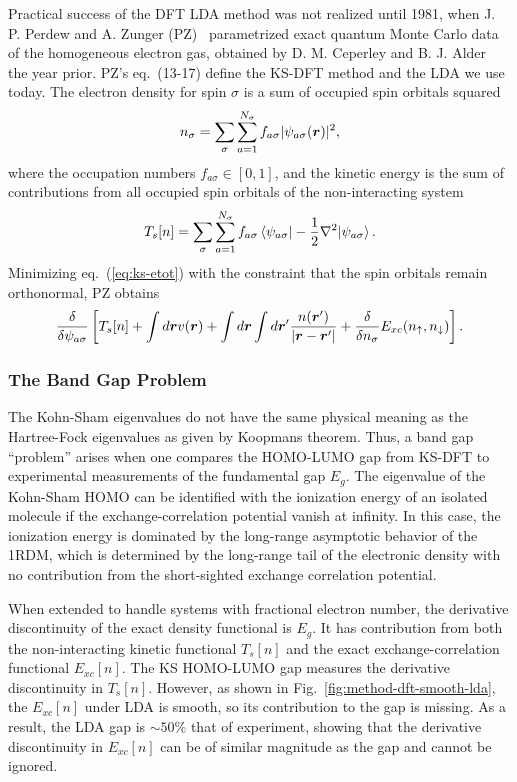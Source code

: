 Practical success of the DFT LDA method was not realized until 1981, when J. P. Perdew and A. Zunger (PZ)~\cite{Perdew1981} parametrized exact quantum Monte Carlo data of the homogeneous electron gas, obtained by D. M. Ceperley and B. J. Alder~\cite{Ceperley1980} the year prior. PZ's eq.~(13-17) define the KS-DFT method and the LDA we use today. The electron density for spin $\sigma$ is a sum of occupied spin orbitals squared
\begin{align}
n_{\sigma} = \sum\limits_{\sigma}\sum\limits_{a=1}^{N_{\sigma}}
f_{a\sigma} \vert\psi_{a\sigma}(\boldsymbol{r})\vert^2,
\end{align}
where the occupation numbers $f_{a\sigma}\in[0, 1]$, and the kinetic energy is the sum of contributions from all occupied spin orbitals of the non-interacting system
\begin{align}
T_s[n] = \sum\limits_\sigma\sum\limits_{a=1}^{N_{\sigma}}
f_{a\sigma} \braket{\psi_{a\sigma}|-\frac{1}{2}\nabla^2|\psi_{a\sigma}}.
\end{align}
Minimizing eq.~(\ref{eq:ks-etot}) with the constraint that the spin orbitals remain orthonormal, PZ obtains
\begin{align}
\dfrac{\delta}{\delta\psi_{a\sigma}} \left[
T_s[n] + \int d\boldsymbol{r}v(\boldsymbol{r}) + \int d\boldsymbol{r}\int d\boldsymbol{r}' \dfrac{n(\boldsymbol{r}')}{\vert\boldsymbol{r}-\boldsymbol{r}'\vert} +
\dfrac{\delta}{\delta n_{\sigma}} E_{xc}(n_{\uparrow},n_{\downarrow})
\right].
\end{align}

\subsubsection{The Band Gap Problem} \label{sec:method-dft-bandgap}
The Kohn-Sham eigenvalues do not have the same physical meaning as the Hartree-Fock eigenvalues as given by Koopmans theorem. Thus, a band gap ``problem'' arises when one compares the HOMO-LUMO gap from KS-DFT to experimental measurements of the fundamental gap $E_g$. The eigenvalue of the Kohn-Sham HOMO can be identified with the ionization energy of an isolated molecule if the exchange-correlation potential vanish at infinity.
In this case, the ionization energy is dominated by the long-range asymptotic behavior of the 1RDM, which is determined by the long-range tail of the electronic density with no contribution from the short-sighted exchange correlation potential.

When extended to handle systems with fractional electron number, the derivative discontinuity of the exact density functional is $E_g$. It has contribution from both the non-interacting kinetic functional $T_s[n]$ and the exact exchange-correlation functional $E_{xc}[n]$. The KS HOMO-LUMO gap measures the derivative discontinuity in $T_s[n]$. However, as shown in Fig.~\ref{fig:method-dft-smooth-lda}, the $E_{xc}[n]$ under LDA is smooth, so its contribution to the gap is missing. As a result, the LDA gap is $\sim 50\%$ that of experiment, showing that the derivative discontinuity in $E_{xc}[n]$ can be of similar magnitude as the gap and cannot be ignored.

